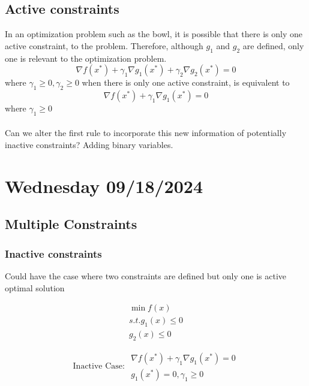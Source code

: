 \subsection{Active constraints}
In an optimization problem such as the bowl, it is possible that there is only one active constraint, to the problem. Therefore, although $g_1$ and $g_2$ are defined, only one is relevant to the optimization problem.
\begin{equation}
  \nabla f(x^*) + \gamma_1 \nabla g_1(x^*) + \gamma_2 \nabla g_2(x^*)  = 0
\end{equation}
where $\gamma_1 \geq 0, \gamma_2 \geq 0$ when there is only one active constraint, is equivalent to
\begin{equation}
  \nabla f(x^*) + \gamma_1 \nabla g_1(x^*)  = 0
\end{equation}
where $\gamma_1 \geq 0 $
\\ \\
Can we alter the first rule to incorporate this new information of potentially inactive constraints? Adding binary variables.

\section{Wednesday 09/18/2024}
\subsection{Multiple Constraints}
\subsubsection{Inactive constraints}
Could have the case where two constraints are defined but only one is active optimal solution

\begin{equation}
  \begin{aligned}
    \min f(x) \\
    s.t. g_1(x) \leq 0 \\
    g_2(x) \leq 0
  \end{aligned}
\end{equation}

\begin{equation}
  \text{Inactive Case: }
  \begin{aligned}
    \nabla f(x^*) + \gamma_1 \nabla g_1(x^*)  = 0 \\
    g_1(x^*) = 0, \gamma_1 \geq 0
  \end{aligned}
\end{equation}

